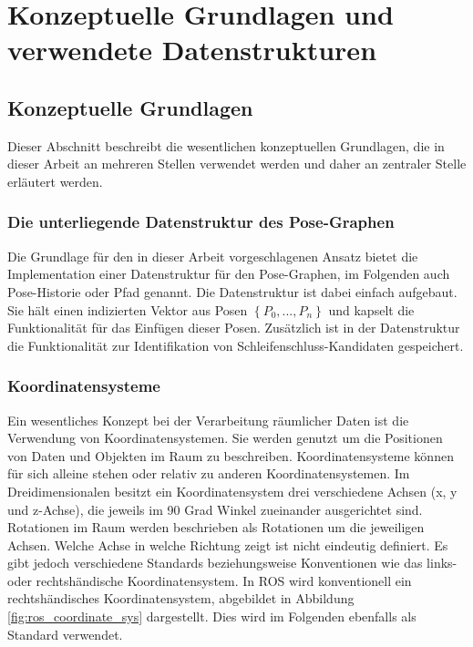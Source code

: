 \chapter{Konzeptuelle Grundlagen und verwendete Datenstrukturen}
\label{chapter:grundlagen}

\section{Konzeptuelle Grundlagen}

Dieser Abschnitt beschreibt die wesentlichen konzeptuellen Grundlagen, die in dieser Arbeit an mehreren Stellen verwendet werden und daher an zentraler Stelle erläutert werden.

\subsection{Die unterliegende Datenstruktur des Pose-Graphen}
\label{section:pose_graph}

Die Grundlage für den in dieser Arbeit vorgeschlagenen Ansatz bietet die Implementation einer Datenstruktur für den Pose-Graphen, im Folgenden auch Pose-Historie oder Pfad genannt. Die Datenstruktur ist dabei einfach aufgebaut. Sie hält einen indizierten Vektor aus Posen $\left\lbrace P_0, ..., P_n \right\rbrace$ und kapselt die Funktionalität für das Einfügen dieser Posen. Zusätzlich ist in der Datenstruktur die Funktionalität zur Identifikation von Schleifenschluss-Kandidaten gespeichert.

\subsection{Koordinatensysteme}

Ein wesentliches Konzept bei der Verarbeitung räumlicher Daten ist die Verwendung von Koordinatensystemen.
Sie werden genutzt um die Positionen von Daten und Objekten im Raum zu beschreiben.
Koordinatensysteme können für sich alleine stehen oder relativ zu anderen Koordinatensystemen.
Im Dreidimensionalen besitzt ein Koordinatensystem drei verschiedene Achsen (x, y und z-Achse), die jeweils im 90 Grad Winkel zueinander ausgerichtet sind.
Rotationen im Raum werden beschrieben als Rotationen um die jeweiligen Achsen.
Welche Achse in welche Richtung zeigt ist nicht eindeutig definiert.
Es gibt jedoch verschiedene Standards beziehungsweise Konventionen wie das links- oder rechtshändische Koordinatensystem.
In ROS wird konventionell ein rechtshändisches Koordinatensystem, abgebildet in Abbildung \ref{fig:ros_coordinate_sys} dargestellt. Dies wird im Folgenden ebenfalls als Standard verwendet.

